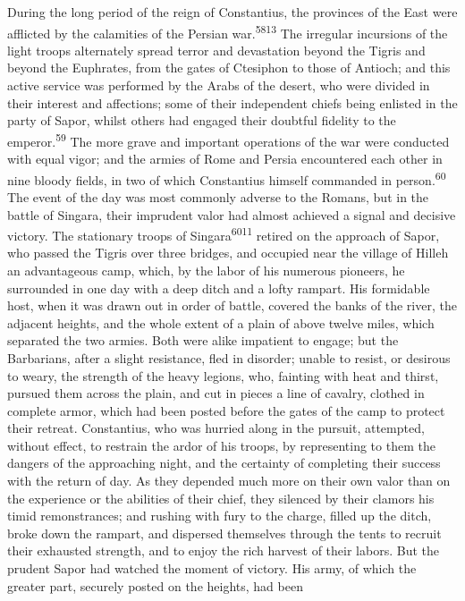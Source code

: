 During the long period of the reign of Constantius, the provinces
of the East were afflicted by the calamities of the Persian war.\textsuperscript{5813}
The irregular incursions of the light troops alternately
spread terror and devastation beyond the Tigris and beyond the
Euphrates, from the gates of Ctesiphon to those of Antioch; and
this active service was performed by the Arabs of the desert, who
were divided in their interest and affections; some of their
independent chiefs being enlisted in the party of Sapor, whilst
others had engaged their doubtful fidelity to the emperor.\textsuperscript{59} The
more grave and important operations of the war were conducted
with equal vigor; and the armies of Rome and Persia encountered
each other in nine bloody fields, in two of which Constantius
himself commanded in person.\textsuperscript{60} The event of the day was most
commonly adverse to the Romans, but in the battle of Singara,
their imprudent valor had almost achieved a signal and decisive
victory. The stationary troops of Singara\textsuperscript{6011} retired on the
approach of Sapor, who passed the Tigris over three bridges, and
occupied near the village of Hilleh an advantageous camp, which,
by the labor of his numerous pioneers, he surrounded in one day
with a deep ditch and a lofty rampart. His formidable host, when
it was drawn out in order of battle, covered the banks of the
river, the adjacent heights, and the whole extent of a plain of
above twelve miles, which separated the two armies. Both were
alike impatient to engage; but the Barbarians, after a slight
resistance, fled in disorder; unable to resist, or desirous to
weary, the strength of the heavy legions, who, fainting with heat
and thirst, pursued them across the plain, and cut in pieces a
line of cavalry, clothed in complete armor, which had been posted
before the gates of the camp to protect their retreat.
Constantius, who was hurried along in the pursuit, attempted,
without effect, to restrain the ardor of his troops, by
representing to them the dangers of the approaching night, and
the certainty of completing their success with the return of day.
As they depended much more on their own valor than on the
experience or the abilities of their chief, they silenced by
their clamors his timid remonstrances; and rushing with fury to
the charge, filled up the ditch, broke down the rampart, and
dispersed themselves through the tents to recruit their exhausted
strength, and to enjoy the rich harvest of their labors. But the
prudent Sapor had watched the moment of victory. His army, of
which the greater part, securely posted on the heights, had been
